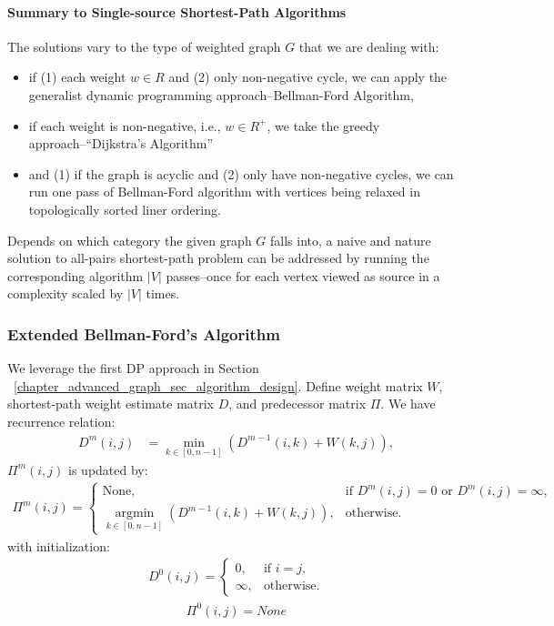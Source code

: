 \documentclass[../main.tex]{subfiles}
\begin{document}
\paragraph{Summary to Single-source Shortest-Path Algorithms} The solutions vary to the type of weighted graph $G$ that we are dealing with:
\begin{itemize}
    \item if (1) each weight $w \in R$ and (2) only non-negative cycle, we can apply the generalist dynamic programming approach--Bellman-Ford Algorithm,
    \item if each weight is non-negative, i.e., $w \in R^{+}$, we take  the greedy approach--``Dijkstra's Algorithm''
    \item and (1) if the graph is acyclic and (2) only have non-negative cycles, we can run one pass of Bellman-Ford algorithm with vertices being relaxed in topologically sorted liner ordering.
\end{itemize}
Depends on which category the given graph $G$ falls into, a naive and nature solution to all-pairs shortest-path problem can be addressed by running the corresponding algorithm $|V|$ passes--once for each vertex viewed as source in a complexity scaled by $|V|$ times. 
\subsubsection{Extended Bellman-Ford's Algorithm} We leverage the first DP approach in Section ~\ref{chapter_advanced_graph_sec_algorithm_design}. Define weight matrix $W$,  shortest-path weight estimate matrix $D$, and predecessor matrix $\Pi$. We have recurrence relation:
\begin{align}
    D^{m}{(i, j)} &= \min_{k\in [0, n-1] }(D^{m-1}{(i, k)}+W{(k, j)}),
    \label{eq_recurrence_extended_bellman}
\end{align}
$\Pi^{m}{(i,j)}$ is updated by:
\begin{align}
     \Pi^{m}{(i,j)} = \left\{ 
    \begin{array}{ll}
   \mbox{None,} &\mbox{if } D^{m}{(i, j)=0}  \mbox{ or } D^{m}{(i, j)} = \infty,\\
  \operatorname*{argmin}_{k \in [0, n-1]} (D^{m-1}{(i, k)}+W{(k, j)}), &\mbox{otherwise. } 
    \end{array}
    \right.
    \label{eq_bellman_predecessor}
\end{align}
with initialization:
\begin{align}
     D^{0}{(i, j)} = \left\{ 
    \begin{array}{ll}
   0, & \mbox{if   } i=j,  \\
    \infty, &\mbox{otherwise.}
    \end{array}
    \right.
\label{eq_extend_bellman_ford}
\end{align}
\begin{align}
     \Pi^{0}{(i,j)} = None
    \label{eq_bellman_predecessor}
\end{align}
\end{document}
